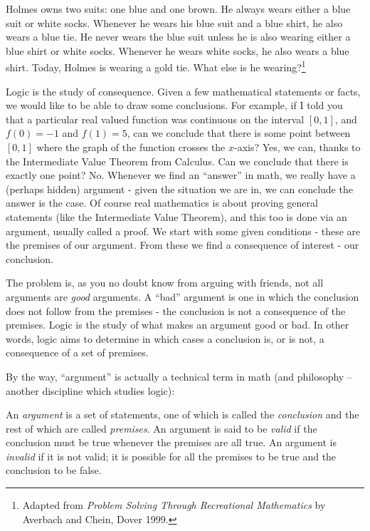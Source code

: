 \documentclass[12pt]{article}
\begin{document}
\begin{activity}
Holmes owns two suits: one blue and one brown.  He always wears either a blue suit or white socks.  Whenever he wears his blue suit and a blue shirt, he also wears a blue tie.  He never wears the blue suit unless he is also wearing either a blue shirt or white socks.  Whenever he wears white socks, he also wears a blue shirt.  Today, Holmes is wearing a gold tie.  What else is he wearing?\footnote{Adapted from \textit{Problem Solving Through Recreational Mathematics} by Averbach and Chein, Dover 1999.}
\end{activity}


Logic is the study of consequence.  Given a few mathematical statements or facts, we would like to be able to draw some conclusions.  For example, if I told you that a particular real valued function was continuous on the interval $[0,1]$, and $f(0) = -1$  and $f(1) = 5$, can we conclude that there is some point between $[0,1]$ where the graph of the function crosses the $x$-axis? Yes, we can, thanks to the Intermediate Value Theorem from Calculus.  Can we conclude that there is exactly one point?  No.  Whenever we find an ``answer'' in math, we really have a (perhaps hidden) argument - given the situation we are in, we can conclude the answer is the case.  Of course real mathematics is about proving general statements (like the Intermediate Value Theorem), and this too is done via an argument, usually called a proof.  We start with some given conditions - these are the premises of our argument.  From these we find a consequence of interest - our conclusion.  

The problem is, as you no doubt know from arguing with friends, not all arguments are \textit{good} arguments.  A ``bad'' argument is one in which the conclusion does not follow from the premises - the conclusion is not a consequence of the premises.  Logic is the study of what makes an argument good or bad.  In other words, logic aims to determine in which cases a conclusion is, or is not, a consequence of a set of premises.

By the way, ``argument'' is actually a technical term in math (and philosophy -- another discipline which studies logic):
\begin{definition}
 An {\em argument} is a set of statements, one of which is called the {\em conclusion} and the rest of which are called {\em premises}.  An argument is said to be {\em valid} if the conclusion must be true whenever the premises are all true.  An argument is {\em invalid} if it is not valid; it is possible for all the premises to be true and the conclusion to be false.
\end{definition}
\end{document}
